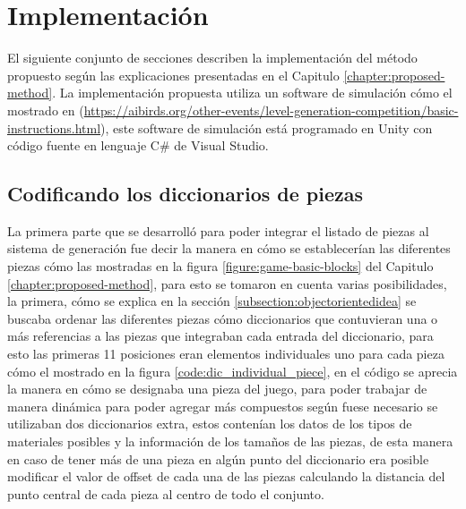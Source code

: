 \chapter{Implementación}
\label{chapter:implementation}

El siguiente conjunto de secciones describen la implementación del método
propuesto según las explicaciones presentadas en el Capitulo
\ref{chapter:proposed-method}. La implementación propuesta utiliza un software
de simulación cómo el mostrado en \cite{Renz2013}
(\url{https://aibirds.org/other-events/level-generation-competition/basic-instructions.html}),
este software de simulación está programado en Unity con código fuente en
lenguaje C\# de Visual Studio.

\section{Codificando los diccionarios de piezas}
\label{section:piece_dictionary}

La primera parte que se desarrolló para poder integrar el listado de piezas al
sistema de generación fue decir la manera en cómo se establecerían las
diferentes piezas cómo las mostradas en la figura \ref{figure:game-basic-blocks}
del Capitulo \ref{chapter:proposed-method}, para esto se tomaron en cuenta
varias posibilidades, la primera, cómo se explica en la sección
\ref{subsection:objectorientedidea} se buscaba ordenar las diferentes piezas
cómo diccionarios que contuvieran una o más referencias a las piezas que
integraban cada entrada del diccionario, para esto las primeras 11 posiciones
eran elementos individuales uno para cada pieza cómo el mostrado en la figura
\ref{code:dic_individual_piece}, en el código se aprecia la manera en cómo se
designaba una pieza del juego, para poder trabajar de manera dinámica para poder
agregar más compuestos según fuese necesario se utilizaban dos diccionarios
extra, estos contenían los datos de los tipos de materiales posibles y la
información de los tamaños de las piezas, de esta manera en caso de tener más de
una pieza en algún punto del diccionario era posible modificar el valor de
offset de cada una de las piezas calculando la distancia del punto central de
cada pieza al centro de todo el conjunto.

